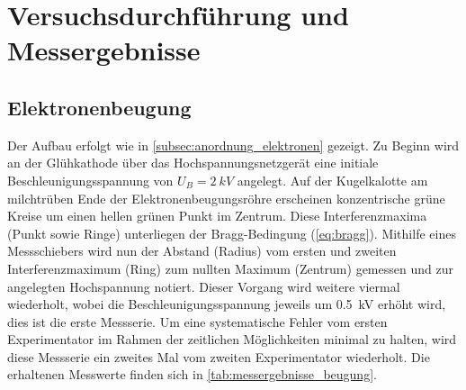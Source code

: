 \documentclass[ngerman]{scrartcl}
\begin{document}
\section{Versuchsdurchführung und Messergebnisse}
\label{sec:versuchsdurchfuehrung_messergebnisse}

\subsection{Elektronenbeugung}
\label{subsec:durchfuehrung_elektronenbeugung}

Der Aufbau erfolgt wie in \autoref{subsec:anordnung_elektronen} gezeigt. Zu Beginn wird an der Glühkathode über das Hochspannungsnetzgerät eine initiale Beschleunigungsspannung von $U_B = \SI{2}{kV}$ angelegt. Auf der Kugelkalotte am milchtrüben Ende der Elektronenbeugungsröhre erscheinen konzentrische grüne Kreise um einen hellen grünen Punkt im Zentrum. Diese Interferenzmaxima (Punkt sowie Ringe) unterliegen der Bragg-Bedingung (\autoref{eq:bragg}). Mithilfe eines Messschiebers wird nun der Abstand (Radius) vom ersten und zweiten Interferenzmaximum (Ring) zum nullten Maximum (Zentrum) gemessen und zur angelegten Hochspannung notiert. Dieser Vorgang wird weitere viermal wiederholt, wobei die Beschleunigungsspannung jeweils um \SI{0.5}{kV} erhöht wird, dies ist die erste Messserie. Um eine systematische Fehler vom ersten Experimentator im Rahmen der zeitlichen Möglichkeiten minimal zu halten, wird diese Messserie ein zweites Mal vom zweiten Experimentator wiederholt. Die erhaltenen Messwerte finden sich in \autoref{tab:messergebnisse_beugung}.
%
\end{document}
